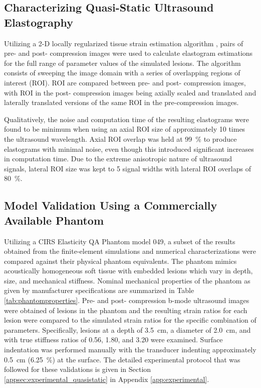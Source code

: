 		\subsection{Characterizing Quasi-Static Ultrasound Elastography}
			\label{sec:elastography_algorithm}
			Utilizing a 2-D locally regularized tissue strain estimation algorithm \cite{brusseau08}, pairs of pre- and post- compression images were used to calculate elastogram estimations for the full range of parameter values of the simulated lesions. The algorithm consists of sweeping the image domain with a series of overlapping regions of interest (ROI). ROI are compared between pre- and post- compression images, with ROI in the post- compression images being axially scaled and translated and laterally translated versions of the same ROI in the pre-compression images.

			Qualitatively, the noise and computation time of the resulting elastograms were found to be minimum when using an axial ROI size of approximately 10 times the ultrasound wavelength. Axial ROI overlap was held at \SI{99}{\percent} to produce elastograms with minimal noise, even though this introduced significant increases in computation time. Due to the extreme anisotropic nature of ultrasound signals, lateral ROI size was kept to 5 signal widths with lateral ROI overlaps of \SI{80}{\percent}.

		\subsection{Model Validation Using a Commercially Available Phantom}
			Utilizing a CIRS Elasticity QA Phantom model 049, a subset of the results obtained from the finite-element simulations and numerical characterizations were compared against their physical phantom equivalents. The phantom mimics acoustically homogeneous soft tissue with embedded lesions which vary in depth, size, and mechanical stiffness. Nominal mechanical properties of the phantom as given by manufacturer specifications are summarized in Table \ref{tab:phantomproperties}. Pre- and post- compression b-mode ultrasound images were obtained of lesions in the phantom and the resulting strain ratios for each lesion were compared to the simulated strain ratios for the specific combination of parameters. Specifically, lesions at a depth of \SI{3.5}{\cm}, a diameter of \SI{2.0}{\cm}, and with true stiffness ratios of 0.56, 1.80, and 3.20 were examined. Surface indentation was performed manually with the transducer indenting approximately \SI{0.5}{\cm} (\SI{6.25}{\percent}) at the surface. The detailed experimental protocol that was followed for these validations is given in Section \ref{appsec:experimental_quasistatic} in Appendix \ref{app:experimental}.

